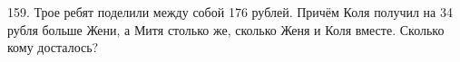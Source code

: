 159. Трое ребят поделили между собой 176 рублей. Причём Коля получил на 34 рубля больше Жени, а Митя столько же, сколько Женя и Коля вместе. Сколько кому досталось?\\
